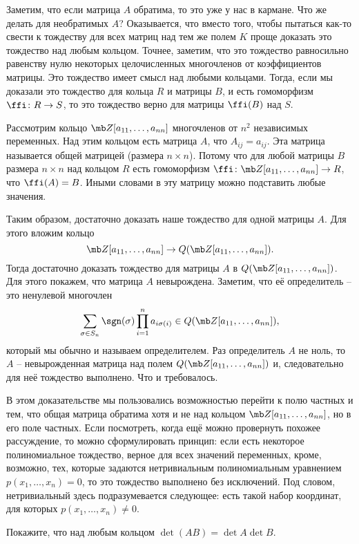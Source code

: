  Заметим, что если матрица $A$ обратима, то это уже у нас в кармане. Что же делать для необратимых $A$?
Оказывается, что вместо того, чтобы пытаться как-то свести к тождеству для всех матриц над тем же полем $K$ проще доказать это тождество над любым кольцом. Точнее, заметим, что это тождество равносильно равенству нулю некоторых целочисленных многочленов от коэффициентов матрицы. Это тождество имеет смысл над любыми кольцами. Тогда, если мы доказали это тождество для кольца $R$ и матрицы $B$, и есть гомоморфизм $\ffi \colon R \to S$, то это тождество верно для матрицы $\ffi(B)$ над $S$.

Рассмотрим кольцо $\mb Z[a_{11}, \dots, a_{nn}]$ многочленов от $n^2$ независимых переменных. Над этим кольцом есть матрица $A$, что $A_{ij}=a_{ij}$. Эта матрица называется общей матрицей (размера $n\times n$). Потому что для любой матрицы $B$ размера $n\times n$ над кольцом $R$ есть гомоморфизм $\ffi \colon \mb Z[a_{11},\dots,a_{nn}]\to R $, что $\ffi(A)=B$. Иными словами в эту матрицу можно подставить любые значения.

Таким образом, достаточно доказать наше тождество для одной матрицы $A$. Для этого вложим кольцо
$$\mb Z[a_{11},\dots,a_{nn}] \to Q(\mb Z[a_{11},\dots,a_{nn}]).$$ Тогда достаточно доказать тождество для матрицы $A$ в $Q(\mb Z[a_{11},\dots,a_{nn}])$. Для этого покажем, что матрица $A$ невырождена. Заметим, что её определитель -- это ненулевой многочлен $$\sum_{\sigma \in S_n} \sgn(\sigma) \prod_{i=1}^n a_{i\sigma(i)} \in Q(\mb Z[a_{11},\dots,a_{nn}]),$$ который мы обычно и называем определителем. Раз определитель $A$ не ноль, то $A$ -- невырожденная матрица над полем $Q(\mb Z[a_{11},\dots,a_{nn}])$ и, следовательно для неё тождество выполнено. Что и требовалось.
\endproof
\ethrm

В этом доказательстве мы пользовались возможностью перейти к полю частных и тем, что общая матрица обратима хотя и не над кольцом $\mb Z[a_{11},\dots,a_{nn}]$, но в его поле частных. Если посмотреть, когда ещё можно провернуть похожее рассуждение, то можно сформулировать принцип: если есть некоторое полиномиальное тождество, верное для всех значений переменных, кроме, возможно, тех, которые задаются нетривиальным полиномиальным уравнением $p(x_1,\dots,x_n)=0$, то это тождество выполнено без исключений. Под словом, нетривиальный здесь подразумевается следующее: есть такой набор координат, для которых $p(x_1,\dots,x_n)\neq 0$. 

\upr Покажите, что над любым кольцом $\det(AB)=\det A \det B$.
\eupr


